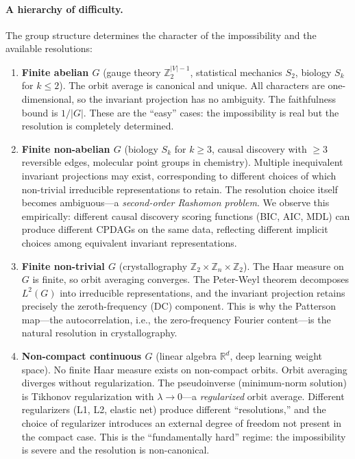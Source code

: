 \documentclass[11pt,a4paper]{article}
\begin{document}
\paragraph{A hierarchy of difficulty.}
The group structure determines the character of the impossibility and the
available resolutions:

\begin{enumerate}
  \item \textbf{Finite abelian $G$} (gauge theory $\mathbb{Z}_2^{|V|-1}$,
    statistical mechanics $S_2$, biology $S_k$ for $k \leq 2$).
    The orbit average is canonical and unique.  All characters are
    one-dimensional, so the invariant projection has no ambiguity.
    The faithfulness bound is $1/|G|$.  These are the ``easy'' cases:
    the impossibility is real but the resolution is completely determined.

  \item \textbf{Finite non-abelian $G$} (biology $S_k$ for $k \geq 3$,
    causal discovery with $\geq 3$ reversible edges, molecular point groups in chemistry).
    Multiple inequivalent invariant projections may exist, corresponding
    to different choices of which non-trivial irreducible representations
    to retain.  The resolution choice itself becomes ambiguous---a
    \emph{second-order Rashomon problem}.  We observe this empirically:
    different causal discovery scoring functions (BIC, AIC, MDL) can
    produce different CPDAGs on the same data, reflecting different
    implicit choices among equivalent invariant representations.

  \item \textbf{Finite non-trivial $G$} (crystallography $\mathbb{Z}_2 \times \mathbb{Z}_n \times \mathbb{Z}_2$).
    The Haar measure on $G$ is finite, so orbit averaging converges.
    The Peter-Weyl theorem decomposes $L^2(G)$ into irreducible
    representations, and the invariant projection retains precisely the
    zeroth-frequency (DC) component.  This is why the Patterson
    map---the autocorrelation, i.e., the zero-frequency Fourier
    content---is the natural resolution in crystallography.

  \item \textbf{Non-compact continuous $G$} (linear algebra $\mathbb{R}^d$,
    deep learning weight space).
    No finite Haar measure exists on non-compact orbits.  Orbit averaging
    diverges without regularization.  The pseudoinverse (minimum-norm
    solution) is Tikhonov regularization with $\lambda \to 0$---a
    \emph{regularized} orbit average.  Different regularizers (L1, L2,
    elastic net) produce different ``resolutions,'' and the choice of
    regularizer introduces an external degree of freedom not present in the
    compact case.  This is the ``fundamentally hard'' regime: the
    impossibility is severe and the resolution is non-canonical.
\end{enumerate}
\end{document}
